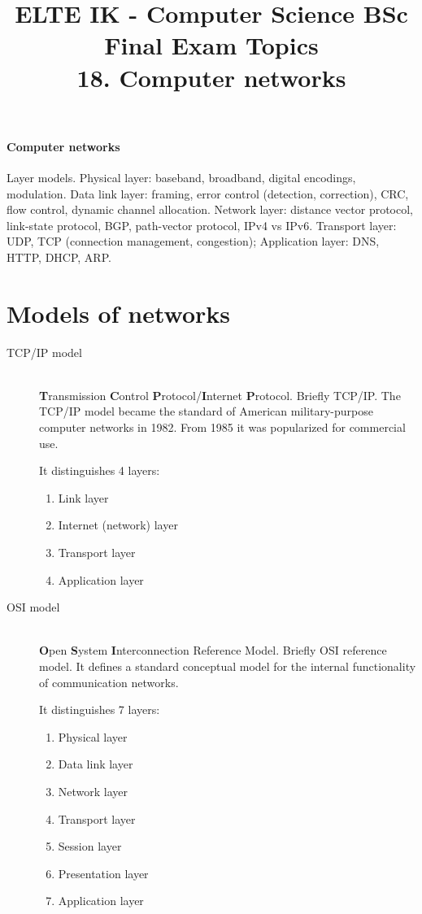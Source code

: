 \documentclass[margin=0px]{article}
\title{\textbf{{\Large ELTE IK - Computer Science BSc} \vspace{0.2cm} \\ {\huge Final Exam Topics}} \vspace{0.3cm} \\ 18. Computer networks}
\author{}
\date{}
\newenvironment{tetel}[1]{\paragraph{#1 \\}}{}
\begin{document}
\maketitle

\begin{center}
\end{center}

\begin{tetel}{Computer networks}
    Layer models. Physical layer: baseband, broadband, digital encodings, modulation. Data link layer: framing, error control (detection, correction), CRC, flow control, dynamic channel allocation. Network layer: distance vector protocol, link-state protocol, BGP, path-vector protocol, IPv4 vs IPv6. Transport layer: UDP, TCP (connection management, congestion); Application layer: DNS, HTTP, DHCP, ARP.
\end{tetel}

\section{Models of networks}
\begin{description}
    \item[TCP/IP model]  \hfill \\
        \textbf{T}ransmission \textbf{C}ontrol \textbf{P}rotocol/\textbf{I}nternet \textbf{P}rotocol. Briefly TCP/IP. The TCP/IP model became the standard of American military-purpose computer networks in 1982. From 1985 it was popularized for commercial use.

        It distinguishes 4 layers:
        \begin{enumerate}
            \item Link layer
            \item Internet (network) layer
            \item Transport layer
            \item Application layer
        \end{enumerate}
    \item[OSI model]  \hfill \\
        \textbf{O}pen \textbf{S}ystem \textbf{I}nterconnection Reference Model. Briefly OSI reference model. It defines a standard conceptual model for the internal functionality of communication networks.

        It distinguishes 7 layers:
        \begin{enumerate}
            \item Physical layer
            \item Data link layer
            \item Network layer
            \item Transport layer
            \item Session layer
            \item Presentation layer
            \item Application layer
        \end{enumerate}
\end{description}
\end{document}
